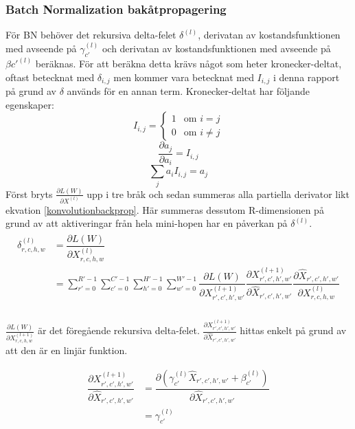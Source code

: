 \documentclass[a4paper,11pt,twoside]{article}
\newcommand*{\pd}[2]{\ensuremath{\dfrac{\partial #1}{\partial #2}}}
\newcommand*{\inpd}[2]{\ensuremath{\frac{\partial #1}{\partial #2}}}
\begin{document}
\subsubsection{Batch Normalization bakåtpropagering}
För BN behöver det rekursiva delta-felet $\delta^{(l)}$, derivatan av kostandsfunktionen med avseende på $\gamma_{c'}^{(l)}$ och derivatan av kostandsfunktionen med avseende på $\beta{c'}^{(l)}$ beräknas. För att beräkna detta krävs något som heter kronecker-deltat, oftast betecknat med $\delta_{i,j}$ men kommer vara betecknat med $I_{i,j}$ i denna rapport på grund av $\delta$ används för en annan term. Kronecker-deltat har följande egenskaper: \cite{webBN1} \cite{webBN2}
\begin{equation}\label{kroneckerdelta}
I_{i,j} = \begin{cases} 1 & \mbox{om } i = j \\ 0 & \mbox{om } i \neq j  \end{cases}
\end{equation}
\begin{equation}\label{kroneckerdeltaDERIVATIVE}
\pd{a_{j}}{a_i} = I_{i,j}
\end{equation}
\begin{equation}\label{kroneckerdeltaSUM}
\sum_j  a_i  I_{i,j} = a_j
\end{equation}
Först bryts $\inpd{L(W)}{X^{(l)}}$ upp i tre bråk och sedan summeras alla partiella derivator likt ekvation \eqref{konvolutionbackprop}. \cite{webBN1} \cite{webBN2} Här summeras dessutom R-dimensionen på grund av att aktiveringar från hela mini-hopen har en påverkan på $\delta^{(l)}$.
\begin{align}\label{BN_delta_error}
\begin{split}
	\delta^{(l)}_{r,c,h,w}
		& = \pd{L(W)}{X^{(l)}_{r,c,h,w}} \\
		& = \sum^{R'-1}_{r'=0} \sum^{C'-1}_{c'=0} \sum^{H'-1}_{h'=0} \sum^{W'-1}_{w'=0} \pd{L(W)}{X^{(l+1)}_{r',c',h',w'}} \pd{X^{(l+1)}_{r',c',h',w'}}{\hat{X}_{r',c',h',w'}} \pd{\hat{X}_{r',c',h',w'}}{{X}^{(l)}_{r,c,h,w}}\\
\end{split}
\end{align}

$\inpd{L(W)}{X^{(l+1)}_{r,c,h,w}}$ är det föregående rekursiva delta-felet. $\inpd{X^{(l+1)}_{r',c',h',w'}}{\hat{X}_{r',c',h',w'}}$ hittas enkelt på grund av att den är en linjär funktion. \cite{webBN1} \cite{webBN2}

\begin{equation}\label{BN_dxdxhat}
\begin{split}
	\pd{X^{(l+1)}_{r',c',h',w'}}{\hat{X}_{r',c',h',w'}}
		& = \pd{(\gamma_{c'}^{(l)} \hat{X}_{r',c',h',w'} + \beta_{c'}^{(l)})}{\hat{X}_{r',c',h',w'}} \\
		& =\gamma_{c'}^{(l)}
\end{split}
\end{equation}
\end{document}
